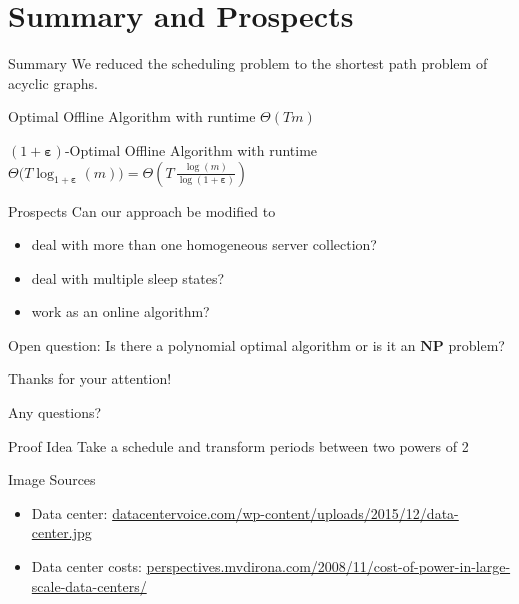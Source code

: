 \documentclass{beamer}
\newcommand{\beps}{\boldsymbol\varepsilon}
\begin{document}
\section{Summary and Prospects}
\begin{frame}{Summary}
We reduced the scheduling problem to the shortest path problem of acyclic graphs.

\pause
\begin{alertbox}
\centering Optimal Offline Algorithm with runtime $\Theta(Tm)$
\end{alertbox}
\pause
\begin{alertbox}
\centering $(1+\beps)$-Optimal Offline Algorithm with runtime $\Theta\bigl(T\log_{1+\beps}(m)\bigr)=\Theta\left(T\,\frac{\log(m)}{\log(1+\beps)}\right)$
\end{alertbox}
\end{frame}
\begin{frame}{Prospects}
Can our approach be modified to\dotso
\pause
\begin{itemize}[<+->]
	\item deal with more than one homogeneous server collection?
	\item deal with multiple sleep states?
	\item work as an online algorithm?
\end{itemize}
\pause[\thebeamerpauses]
Open question: Is there a polynomial optimal algorithm or is it an $\textbf{NP}$ problem?
\end{frame}
\begin{frame}[standout]
Thanks for your attention!

Any questions?
\end{frame}
\begin{frame}{Proof Idea}
\centering Take a schedule and transform periods between two powers of 2

\pause\begin{figure}
	
\end{figure}
\end{frame}
\begin{frame}[allowframebreaks]{Image Sources}
\begin{itemize}
\item Data center: \url{datacentervoice.com/wp-content/uploads/2015/12/data-center.jpg}
\item Data center costs: \url{perspectives.mvdirona.com/2008/11/cost-of-power-in-large-scale-data-centers/}
\end{itemize}
\end{frame}
\end{document}
